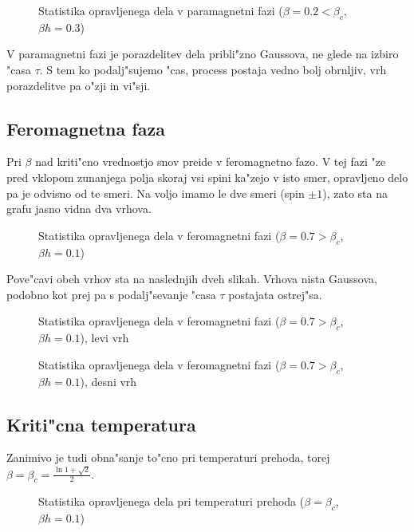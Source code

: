 \documentclass[a4paper,10pt]{article}
\begin{document}
\begin{figure}[H]
\centering
 
 \caption{Statistika opravljenega dela v paramagnetni fazi ($\beta = 0.2 < \beta_c$, $\beta h = 0.3$)}
\end{figure}

V paramagnetni fazi je porazdelitev dela pribli"zno Gaussova, ne glede na izbiro "casa $\tau$. S tem ko podalj"sujemo "cas, process postaja vedno bolj obrnljiv, vrh porazdelitve pa o"zji in vi"sji.  

\subsection{Feromagnetna faza}

Pri $\beta$ nad kriti"cno vrednostjo snov preide v feromagnetno fazo. V tej fazi "ze pred vklopom zunanjega polja skoraj vsi spini ka"zejo v isto smer, opravljeno delo pa je odvisno od te smeri. Na voljo imamo le dve smeri (spin $\pm 1$), zato sta na grafu jasno vidna dva vrhova. 

\begin{figure}[H]
\centering
 
 \caption{Statistika opravljenega dela v feromagnetni fazi ($\beta = 0.7 > \beta_c$, $\beta h = 0.1$)}
\end{figure}

Pove"cavi obeh vrhov sta na naslednjih dveh slikah. Vrhova nista Gaussova, podobno kot prej pa s podalj"sevanje "casa $\tau$ postajata ostrej"sa. 

\begin{figure}[H]
\centering
 
 \caption{Statistika opravljenega dela v feromagnetni fazi ($\beta = 0.7 > \beta_c$, $\beta h = 0.1$), levi vrh}
\end{figure}

\begin{figure}[H]
\centering
 
 \caption{Statistika opravljenega dela v feromagnetni fazi ($\beta = 0.7 > \beta_c$, $\beta h = 0.1$), desni vrh}
\end{figure}

\subsection{Kriti"cna temperatura}

Zanimivo je tudi obna"sanje to"cno pri temperaturi prehoda, torej $\beta = \beta_c = \frac{\ln 1+\sqrt{2}}{2}$. 

\begin{figure}[H]
\centering
 
 \caption{Statistika opravljenega dela pri temperaturi prehoda ($\beta = \beta_c$, $\beta h = 0.1$)}
\end{figure}
\end{document}
